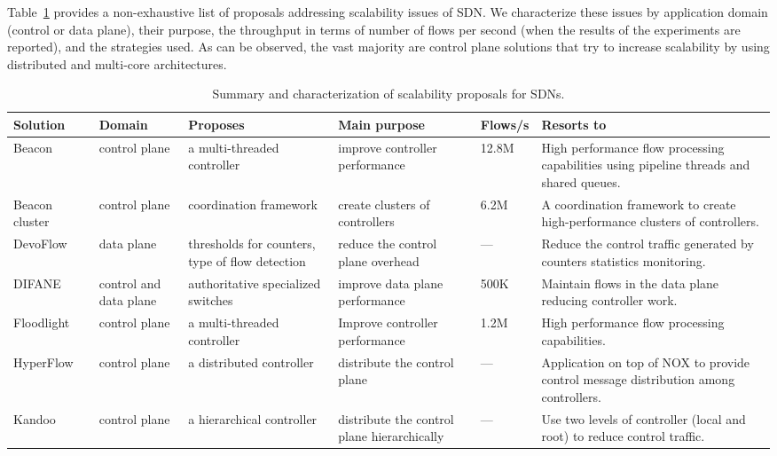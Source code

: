 Table~\ref{tab:scalabilitysolutions} provides a non-exhaustive list of proposals addressing scalability issues of 
SDN. 
We characterize these issues by application domain (control or data plane), their purpose, the throughput in terms of number of flows per second (when the results of the experiments are reported), and the strategies used.
As can be observed, the vast majority are control plane solutions that try to increase scalability by using distributed and multi-core architectures.


{\renewcommand{\arraystretch}{1.4}
\begin{table}[!htp]
\caption{Summary and characterization of scalability proposals for SDNs.}
\label{tab:scalabilitysolutions}
\begin{center}
\footnotesize
\begin{tabularx}{\linewidth}{p{1.9cm}p{1.6cm}p{2.8cm}p{2.5cm}p{1.0cm}X}
\hline
\textbf{Solution} & \textbf{Domain} & \textbf{Proposes} & \textbf{Main purpose} & \textbf{Flows/s} & \textbf{Resorts to} \\\hline
Beacon~\cite{erickson2013} & control plane & a multi-threaded controller & improve controller performance & 12.8M & High performance flow processing capabilities using pipeline threads and shared queues. \\\hline
Beacon cluster~\cite{yazici2012} & control plane & coordination framework & create clusters of controllers & 6.2M & A coordination framework to create high-performance clusters of controllers. \\\hline
DevoFlow~\cite{curtis2011} & data plane & thresholds for counters, type of flow detection & reduce the control plane overhead & --- & Reduce the control traffic generated by counters statistics monitoring. \\\hline
DIFANE~\cite{yu2010-1} & control and data plane & authoritative specialized switches & improve data plane performance & 500K & Maintain flows in the data plane reducing controller work. \\\hline
Floodlight~\cite{erickson2013} & control plane & a multi-threaded controller & Improve controller performance & 1.2M & High performance flow processing capabilities. \\\hline
HyperFlow~\cite{tootoonchian2010} & control plane & a distributed controller & distribute the control plane & --- & Application on top of NOX to provide control message distribution among controllers. \\\hline
Kandoo~\cite{yeganeh2012} & control plane & a hierarchical controller & distribute the control plane hierarchically & --- & Use two levels of controller (local and root) to reduce control traffic. \\\hline

\end{tabularx}
\end{center}
\end{table}}

